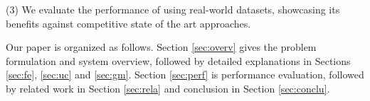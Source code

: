 \stab(3) We evaluate the performance of \sys{} using real-world datasets, showcasing its benefits against competitive state of the art approaches.



Our paper is organized as follows.
Section \ref{sec:overv} gives the problem formulation and system overview, followed by detailed explanations in Sections \ref{sec:fe}, \ref{sec:uc} and \ref{sec:gm}.
Section \ref{sec:perf} is performance evaluation, followed by
related work in Section \ref{sec:rela} and conclusion in Section \ref{sec:conclu}.











